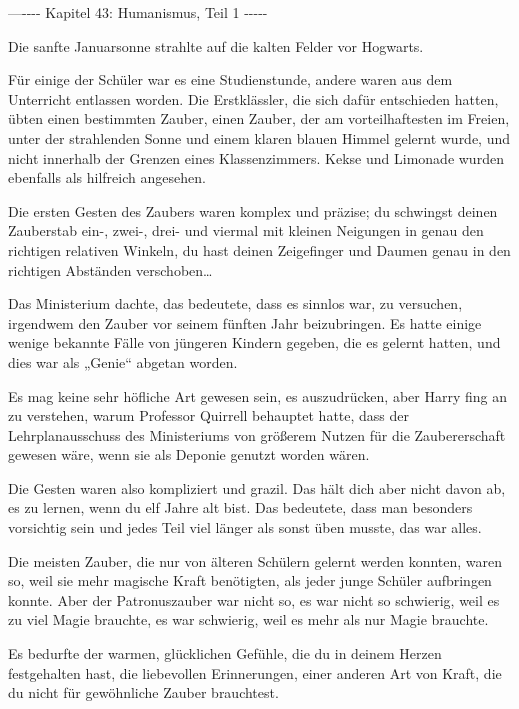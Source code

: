 

\hypertarget{humanismus-teil-1}{%

—\/-\/-\/-\/- Kapitel 43: Humanismus, Teil 1 -\/-\/-\/-\/-

Die sanfte Januarsonne strahlte auf die kalten Felder vor Hogwarts.

Für einige der Schüler war es eine Studienstunde, andere waren aus dem Unterricht entlassen worden. Die Erstklässler, die sich dafür entschieden hatten, übten einen bestimmten Zauber, einen Zauber, der am vorteilhaftesten im Freien, unter der strahlenden Sonne und einem klaren blauen Himmel gelernt wurde, und nicht innerhalb der Grenzen eines Klassenzimmers. Kekse und Limonade wurden ebenfalls als hilfreich angesehen.

Die ersten Gesten des Zaubers waren komplex und präzise; du schwingst deinen Zauberstab ein-, zwei-, drei- und viermal mit kleinen Neigungen in genau den richtigen relativen Winkeln, du hast deinen Zeigefinger und Daumen genau in den richtigen Abständen verschoben…

Das Ministerium dachte, das bedeutete, dass es sinnlos war, zu versuchen, irgendwem den Zauber vor seinem fünften Jahr beizubringen. Es hatte einige wenige bekannte Fälle von jüngeren Kindern gegeben, die es gelernt hatten, und dies war als „Genie“ abgetan worden.

Es mag keine sehr höfliche Art gewesen sein, es auszudrücken, aber Harry fing an zu verstehen, warum Professor Quirrell behauptet hatte, dass der Lehrplanausschuss des Ministeriums von größerem Nutzen für die Zaubererschaft gewesen wäre, wenn sie als Deponie genutzt worden wären.

Die Gesten waren also kompliziert und grazil. Das hält dich aber nicht davon ab, es zu lernen, wenn du elf Jahre alt bist. Das bedeutete, dass man besonders vorsichtig sein und jedes Teil viel länger als sonst üben musste, das war alles.

Die meisten Zauber, die nur von älteren Schülern gelernt werden konnten, waren so, weil sie mehr magische Kraft benötigten, als jeder junge Schüler aufbringen konnte. Aber der Patronuszauber war nicht so, es war nicht so schwierig, weil es zu viel Magie brauchte, es war schwierig, weil es mehr als nur Magie brauchte.

Es bedurfte der warmen, glücklichen Gefühle, die du in deinem Herzen festgehalten hast, die liebevollen Erinnerungen, einer anderen Art von Kraft, die du nicht für gewöhnliche Zauber brauchtest.

}
